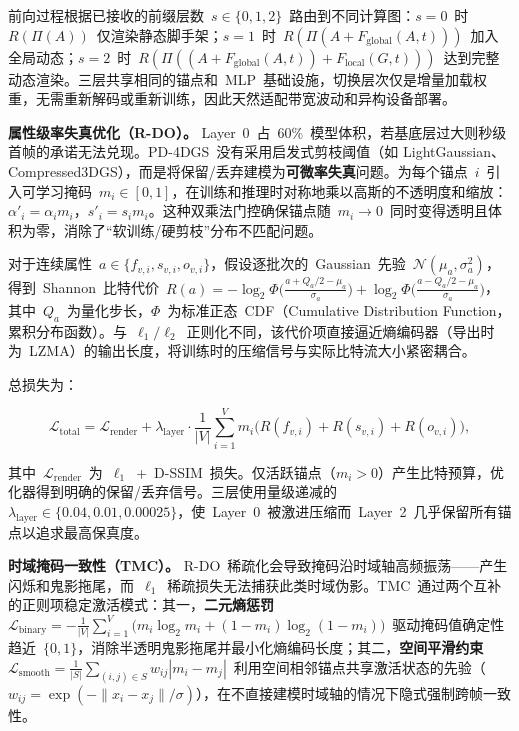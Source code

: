 \noindent 前向过程根据已接收的前缀层数~$s \in \{0, 1, 2\}$~路由到不同计算图：$s=0$~时~$R(\Pi(A))$~仅渲染静态脚手架；$s=1$~时~$R(\Pi(A + F_{\mathrm{global}}(A, t)))$~加入全局动态；$s=2$~时~$R(\Pi((A + F_{\mathrm{global}}(A, t)) + F_{\mathrm{local}}(G, t)))$~达到完整动态渲染。三层共享相同的锚点和~MLP~基础设施，切换层次仅是增量加载权重，无需重新解码或重新训练，因此天然适配带宽波动和异构设备部署。

\smallskip\noindent\textbf{属性级率失真优化（R-DO）。}
Layer~0~占~60\%~模型体积，若基底层过大则秒级首帧的承诺无法兑现。PD-4DGS~没有采用启发式剪枝阈值（如 LightGaussian、Compressed3DGS），而是将保留/丢弃建模为\textbf{可微率失真}问题。为每个锚点~$i$~引入可学习掩码~$m_i \in [0,1]$，在训练和推理时对称地乘以高斯的不透明度和缩放：$\alpha'_i = \alpha_i m_i$，$s'_i = s_i m_i$。这种双乘法门控确保锚点随~$m_i \to 0$~同时变得透明且体积为零，消除了``软训练/硬剪枝''分布不匹配问题。

对于连续属性~$a \in \{f_{v,i}, s_{v,i}, o_{v,i}\}$，假设逐批次的~Gaussian~先验~$\mathcal{N}(\mu_a, \sigma_a^2)$，得到~Shannon~比特代价~$R(a) = -\log_2 \Phi\bigl(\frac{a + Q_a/2 - \mu_a}{\sigma_a}\bigr) + \log_2 \Phi\bigl(\frac{a - Q_a/2 - \mu_a}{\sigma_a}\bigr)$，其中~$Q_a$~为量化步长，$\Phi$~为标准正态~CDF（Cumulative Distribution Function，累积分布函数）。与~$\ell_1/\ell_2$~正则化不同，该代价项直接逼近熵编码器（导出时为~LZMA）的输出长度，将训练时的压缩信号与实际比特流大小紧密耦合。

总损失为：

\begin{equation}
\mathcal{L}_{\mathrm{total}} = \mathcal{L}_{\mathrm{render}} + \lambda_{\mathrm{layer}} \cdot \frac{1}{|V|} \sum_{i=1}^{V} m_i \bigl(R(f_{v,i}) + R(s_{v,i}) + R(o_{v,i})\bigr),
\end{equation}

其中~$\mathcal{L}_{\mathrm{render}}$~为~$\ell_1$~+~D-SSIM~损失。仅活跃锚点（$m_i > 0$）产生比特预算，优化器得到明确的保留/丢弃信号。三层使用量级递减的~$\lambda_{\mathrm{layer}} \in \{0.04, 0.01, 0.00025\}$，使~Layer~0~被激进压缩而~Layer~2~几乎保留所有锚点以追求最高保真度。

\smallskip\noindent\textbf{时域掩码一致性（TMC）。}
R-DO~稀疏化会导致掩码沿时域轴高频振荡——产生闪烁和鬼影拖尾，而~$\ell_1$~稀疏损失无法捕获此类时域伪影。TMC~通过两个互补的正则项稳定激活模式：其一，\textbf{二元熵惩罚}~$\mathcal{L}_{\mathrm{binary}} = -\frac{1}{|V|}\sum_{i=1}^{V} \bigl(m_i \log_2 m_i + (1 - m_i)\log_2(1 - m_i)\bigr)$~驱动掩码值确定性趋近~$\{0, 1\}$，消除半透明鬼影拖尾并最小化熵编码长度；其二，\textbf{空间平滑约束}~$\mathcal{L}_{\mathrm{smooth}} = \frac{1}{|S|}\sum_{(i,j)\in S} w_{ij} |m_i - m_j|$~利用空间相邻锚点共享激活状态的先验（$w_{ij} = \exp(-\|x_i - x_j\|/\sigma)$），在不直接建模时域轴的情况下隐式强制跨帧一致性。


